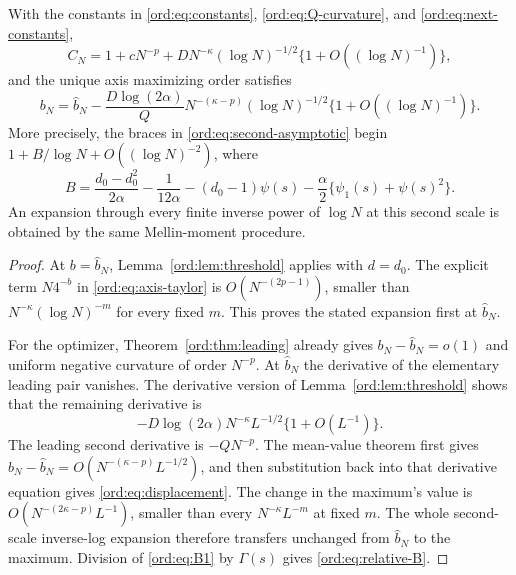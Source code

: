 \begin{theorem}
\label{ord:thm:second}
With the constants in \eqref{ord:eq:constants},
\eqref{ord:eq:Q-curvature}, and \eqref{ord:eq:next-constants},
\begin{equation}\label{ord:eq:second-asymptotic}
 C_N=1+cN^{-p}
       +DN^{-\kappa}(\log N)^{-1/2}
            \{1+O((\log N)^{-1})\},
\end{equation}
and the unique axis maximizing order satisfies
\begin{equation}\label{ord:eq:displacement}
 b_N=\widehat b_N-\frac{D\log(2\alpha)}Q
            N^{-(\kappa-p)}(\log N)^{-1/2}
            \{1+O((\log N)^{-1})\}.
\end{equation}
More precisely, the braces in \eqref{ord:eq:second-asymptotic} begin
$1+B/\log N+O((\log N)^{-2})$, where
\begin{equation}\label{ord:eq:relative-B}
 B=\frac{d_0-d_0^2}{2\alpha}-\frac1{12\alpha}
       -(d_0-1)\psi(s)
       -\frac\alpha2\{\psi_1(s)+\psi(s)^2\}.
\end{equation}
An expansion through every finite inverse power of $\log N$ at this
second scale is obtained by the same Mellin-moment procedure.
\end{theorem}
\begin{proof}
At $b=\widehat b_N$, Lemma~\ref{ord:lem:threshold} applies with $d=d_0$.
The explicit term $N4^{-b}$ in \eqref{ord:eq:axis-taylor} is
$O(N^{-(2p-1)})$, smaller than $N^{-\kappa}(\log N)^{-m}$ for every
fixed $m$. This proves the stated expansion first at $\widehat b_N$.

For the optimizer, Theorem~\ref{ord:thm:leading} already gives
$b_N-\widehat b_N=o(1)$ and uniform negative curvature of order $N^{-p}$.
At $\widehat b_N$ the derivative of the elementary leading pair vanishes.
The derivative version of Lemma~\ref{ord:lem:threshold} shows that the
remaining derivative is
\[
 -D\log(2\alpha)N^{-\kappa}L^{-1/2}\{1+O(L^{-1})\}.
\]
The leading second derivative is $-QN^{-p}$. The mean-value theorem
first gives $b_N-\widehat b_N=O(N^{-(\kappa-p)}L^{-1/2})$, and then
substitution back into that derivative equation gives
\eqref{ord:eq:displacement}. The change in the maximum's value is
$O(N^{-(2\kappa-p)}L^{-1})$, smaller than every
$N^{-\kappa}L^{-m}$ at fixed $m$. The whole second-scale inverse-log
expansion therefore transfers unchanged from $\widehat b_N$ to the
maximum. Division of \eqref{ord:eq:B1} by $\Gamma(s)$ gives
\eqref{ord:eq:relative-B}.
\end{proof}

